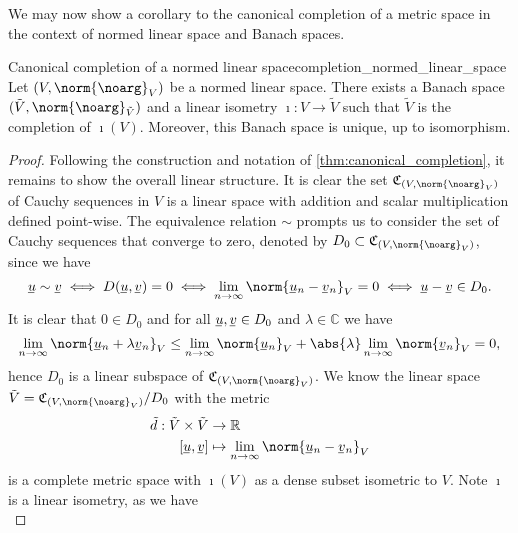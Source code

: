 We may now show a corollary to the canonical completion of a metric space in the context of normed linear space and Banach spaces.
\begin{proposition}{Canonical completion of a normed linear space}{completion_normed_linear_space}
    Let \((V, \norm{\noarg}_V)\) be a normed linear space. There exists a Banach space \((\tilde{V}, \norm{\noarg}_{\tilde{V}})\) and a linear isometry \(\imath : V \to \tilde{V}\) such that \(\tilde{V}\) is the completion of \(\imath(V)\). Moreover, this Banach space is unique, up to isomorphism.
\end{proposition}
\begin{proof}
    Following the construction and notation of \cref{thm:canonical_completion}, it remains to show the overall linear structure. It is clear the set \(\mathfrak{C}_{(V, \norm{\noarg}_{V})}\) of Cauchy sequences in \(V\) is a linear space with addition and scalar multiplication defined point-wise. The equivalence relation \({\sim}\) prompts us to consider the set of Cauchy sequences that converge to zero, denoted by \(D_0 \subset \mathfrak{C}_{(V, \norm{\noarg}_V)}\), since we have
    \begin{equation*}
        \sequnder{u} \sim \sequnder{v} \iff D(\sequnder{u}, \sequnder{v}) = 0 \iff \lim_{n\to\infty}{\norm{\sequnder{u}_n - \sequnder{v}_n}_V} = 0 \iff \sequnder{u} - \sequnder{v} \in D_0.
    \end{equation*}
    It is clear that \(0 \in D_0\) and for all \(\sequnder{u}, \sequnder{v} \in D_0\) and \(\lambda \in \mathbb{C}\) we have
    \begin{equation*}
        \lim_{n\to\infty}{\norm{\sequnder{u}_n + \lambda\sequnder{v}_n}_V} \leq \lim_{n\to\infty}{\norm{\sequnder{u}_n}_V} + \abs{\lambda}\lim_{n\to\infty}{\norm{\sequnder{v}_n}_V} = 0,
    \end{equation*}
    hence \(D_0\) is a linear subspace of \(\mathfrak{C}_{(V, \norm{\noarg}_V)}\). We know the linear space \(\tilde{V} = \mathfrak{C}_{(V, \norm{\noarg}_V)}/D_0\) with the metric
    \begin{align*}
        \tilde{d} : \tilde{V} \times \tilde{V} &\to \mathbb{R}\\
        [\sequnder{u},\sequnder{v}] &\mapsto \lim_{n\to\infty}{\norm{\sequnder{u}_n - \sequnder{v}_n}_V}
    \end{align*}
    is a complete metric space with \(\imath(V)\) as a dense subset isometric to \(V\). Note \(\imath\) is a linear isometry, as we have
    \begin{equation*}

\end{equation*}
\end{proof}
